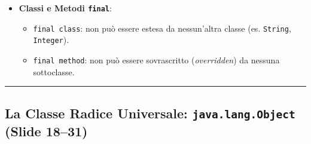 \documentclass[11pt,a4paper,oneside]{report}
\newcommand{\passthrough}[1]{#1}
\providecommand{\tightlist}{\setlength{\itemsep}{0pt}\setlength{\parskip}{0pt}}
\begin{document}
\begin{itemize}
  \begin{itemize}
  \tightlist
  \item
    {[}Attenzione{]} \textbf{I costruttori NON vengono mai ereditati
    dalle sottoclassi}.
  \item
    All'interno del costruttore di una sottoclasse, la prima istruzione
    deve essere una chiamata a \passthrough{\lstinline!super(...)!}
    oppure a un altro costruttore con
    \passthrough{\lstinline!this(...)!}.
  \item
    Se il programmatore non scrive nulla, il compilatore inserisce
    automaticamente \textbf{\passthrough{\lstinline!super();!}}
    (invocazione del costruttore vuoto della superclasse).
  \item
    {[}Attenzione{]} \textbf{Trappola d'esame}: Se la superclasse non
    possiede un costruttore senza parametri (perché ne ha definito uno
    con parametri e non ha aggiunto quello di default), omettere
    \passthrough{\lstinline!super(...)!} genera un \textbf{Compile-Time
    Error}!
  \item
    \passthrough{\lstinline!super.metodo()!} permette inoltre di
    invocare l'implementazione originaria della superclasse, bypassando
    l'override locale.
  \end{itemize}
\item
  \textbf{Classi e Metodi \passthrough{\lstinline!final!}}:

  \begin{itemize}
  \tightlist
  \item
    \passthrough{\lstinline!final class!}: non può essere estesa da
    nessun'altra classe (es. \passthrough{\lstinline!String!},
    \passthrough{\lstinline!Integer!}).
  \item
    \passthrough{\lstinline!final method!}: non può essere sovrascritto
    (\emph{overridden}) da nessuna sottoclasse.
  \end{itemize}
\end{itemize}

\begin{center}\rule{0.5\linewidth}{0.5pt}\end{center}

\subsection{\texorpdfstring{La Classe Radice Universale:
\texttt{java.lang.Object} (Slide
18--31)}{La Classe Radice Universale: java.lang.Object (Slide 18--31)}}\label{chap11_la-classe-radice-universale-java.lang.object-slide-1831}
\end{document}
